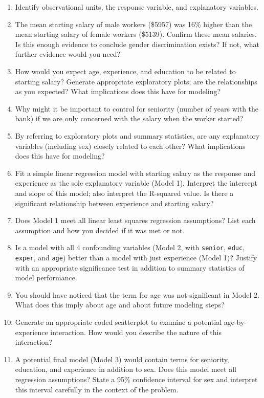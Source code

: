 \documentclass[
]{krantz}
\providecommand{\tightlist}{%
  \setlength{\itemsep}{0pt}\setlength{\parskip}{0pt}}
\begin{document}
\begin{enumerate}
  \begin{enumerate}
  \def\labelenumii{\alph{enumii}.}
  \tightlist
  \item
    Identify observational units, the response variable, and explanatory variables.
  \item
    The mean starting salary of male workers (\$5957) was 16\% higher than the mean starting salary of female workers (\$5139). Confirm these mean salaries. Is this enough evidence to conclude gender discrimination exists? If not, what further evidence would you need?
  \item
    How would you expect age, experience, and education to be related to starting salary? Generate appropriate exploratory plots; are the relationships as you expected? What implications does this have for modeling?
  \item
    Why might it be important to control for seniority (number of years with the bank) if we are only concerned with the salary when the worker started?
  \item
    By referring to exploratory plots and summary statistics, are any explanatory variables (including sex) closely related to each other? What implications does this have for modeling?
  \item
    Fit a simple linear regression model with starting salary as the response and experience as the sole explanatory variable (Model 1). Interpret the intercept and slope of this model; also interpret the R-squared value. Is there a significant relationship between experience and starting salary?
  \item
    Does Model 1 meet all linear least squares regression assumptions? List each assumption and how you decided if it was met or not.
  \item
    Is a model with all 4 confounding variables (Model 2, with \texttt{senior}, \texttt{educ}, \texttt{exper}, and \texttt{age}) better than a model with just experience (Model 1)? Justify with an appropriate significance test in addition to summary statistics of model performance.
  \item
    You should have noticed that the term for age was not significant in Model 2. What does this imply about age and about future modeling steps?
  \item
    Generate an appropriate coded scatterplot to examine a potential age-by-experience interaction. How would you describe the nature of this interaction?
  \item
    A potential final model (Model 3) would contain terms for seniority, education, and experience in addition to sex. Does this model meet all regression assumptions? State a 95\% confidence interval for sex and interpret this interval carefully in the context of the problem.

\end{enumerate}
\end{enumerate}
\end{document}
